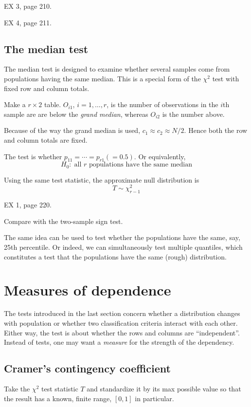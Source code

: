 \documentclass[12pt]{article}
\begin{document}
\example EX 3, page 210.

\example EX 4, page 211.


\subsection{The median test}

The median test is designed to examine whether several samples come from
populations having the same median.
This is a special form of the $\chi^2$ test with fixed row and column
totals.

Make a $r\times 2$ table.
$O_{i1}$, $i=1,\dotsc,r$, is the number of observations in the $i$th
sample are are below the \emph{grand median},
whereas $O_{i2}$ is the number above.

Because of the way the grand median is used,
$c_1 \approx c_2 \approx N/2$.
Hence both the row and column totals are fixed.

The test is whether
$p_{11} = \dotsb = p_{r1} (= 0.5)$.
Or equivalently,
\[
H_0:\;
\text{all $r$ populations have the same median}
\]

Using the same test statistic, the approximate null distribution is
\[
T \sim \chi^2_{r-1}
\]

\example EX 1, page 220.

\exercise Compare with the two-sample sign test.

The same idea can be used to test whether the populations have the same,
say, 25th percentile.
Or indeed, we can simultaneously test multiple quantiles,
which constitutes a test that the populations have the same
(rough) distribution.


\section{Measures of dependence}

The tests introduced in the last section
concern whether a distribution changes with population or whether two
classification criteria interact with each other.
Either way, the test is about whether the rows and columns are
``independent''.
Instead of tests,
one may want a \emph{measure} for the strength of the dependency.

\subsection{Cramer's contingency coefficient}

Take the $\chi^2$ test statistic $T$ and standardize it by its max
possible value so that the result has a known, finite range,
$[0,1]$ in particular.
\end{document}
